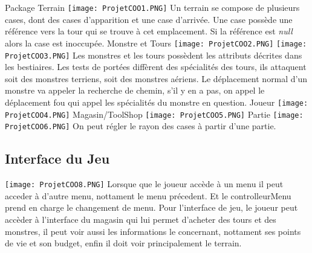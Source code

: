 \documentclass[12pt, letterpaper]{article}
\begin{document}
{\large{Package Terrain} \newline
\texttt{[image: ProjetCOO1.PNG]}\newline
Un terrain se compose de plusieurs cases, dont des cases d'apparition et une case d'arrivée. Une case possède une référence vers la tour qui se trouve à cet emplacement. Si la référence est \textit{null} alors la case est inoccupée.
\clearpage
\BgThispage
\large{Monstre et Tours} \newline
\texttt{[image: ProjetCOO2.PNG]}
\texttt{[image: ProjetCOO3.PNG]}\newline
Les monstres et les tours possèdent les attributs décrites dans les bestiaires. \newline Les tests de portées diffèrent des spécialités des tours, ils attaquent soit des monstres terriens, soit des monstres aériens.
\newline
Le déplacement normal d'un monstre va appeler la recherche de chemin, s'il y en a pas, on appel le déplacement fou qui appel les spécialités du monstre en question.
\clearpage
\BgThispage
\large{Joueur} \newline
\texttt{[image: ProjetCOO4.PNG]} \newline
\clearpage
\BgThispage
\large{Magasin/ToolShop} \newline
\texttt{[image: ProjetCOO5.PNG]} \newline
\large{Partie} \newline
\texttt{[image: ProjetCOO6.PNG]} \newline
On peut régler le rayon des cases à partir d'une partie.
\clearpage
\BgThispage

\subsection{Interface du Jeu}

\texttt{[image: ProjetCOO8.PNG]}\newline
Lorsque que le joueur accède à un menu il peut acceder à d'autre menu, nottament le menu précedent. Et le controlleurMenu prend en charge le changement de menu. \newline
Pour l'interface de jeu, le joueur peut accèder à l'interface du magasin qui lui permet d'acheter des tours et des monstres, il peut voir aussi les informations le concernant, nottament ses points de vie et son budget, enfin il doit voir principalement le terrain.
\clearpage
\BgThispage
}
\end{document}
